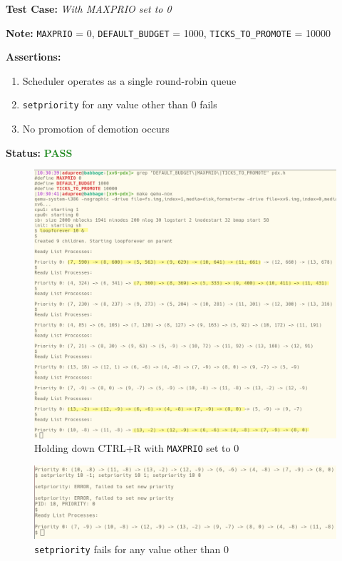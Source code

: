 \documentclass[11pt,letterpaper]{report}
\newcommand{\code}[1]{\colorbox{codegray}{\texttt{#1}}}
\begin{document}
{  \noindent\textbf{Test Case:} \emph{With MAXPRIO set to 0}
  
  \noindent\textbf{Note:} \code{MAXPRIO} = 0, \code{DEFAULT\_BUDGET} = 1000, \code{TICKS\_TO\_PROMOTE} = 10000

  \noindent\textbf{Assertions:}
  \begin{enumerate}[]
  \item Scheduler operates as a single round-robin queue
  \item \code{setpriority} for any value other than 0 fails
  \item No promotion of demotion occurs
  \end{enumerate}  
  
  \noindent\textbf{Status:} \textcolor{ForestGreen}{\textbf{PASS}}\\
  
  \begin{figure}[h!]
	\centering
	\includegraphics[width=1\linewidth]{maxprio-0.png}
	\caption[img]{Holding down CTRL+R with \code{MAXPRIO} set to 0}
	\label{fig:P1compileP0-1}
  \end{figure}

  \begin{figure}[h!]
	\centering
	\includegraphics[width=1\linewidth]{maxprio-0-set.png}
	\caption[img]{\code{setpriority} fails for any value other than 0}
	\label{fig:P1compileP0-1}
  \end{figure}

}
\end{document}

